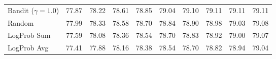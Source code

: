 \begin{tabular}{lYYYYYYYYY}
Bandit ($\gamma=1.0$) & 
77.87 & 78.22 & 78.61 & 78.85 & 79.04 & 79.10 & 79.11 & 79.11 & 79.11\\
Random & 
77.99 & 78.33 & 78.58 & 78.70 & 78.84 & 78.90 & 78.98 & 79.03 & 79.08\\
LogProb Sum & 
77.59 & 78.08 & 78.36 & 78.54 & 78.70 & 78.83 & 78.92 & 79.00 & 79.07\\
LogProb Avg & 
77.41 & 77.88 & 78.16 & 78.38 & 78.54 & 78.70 & 78.82 & 78.94 & 79.04\\
\bottomrule\end{tabular}
